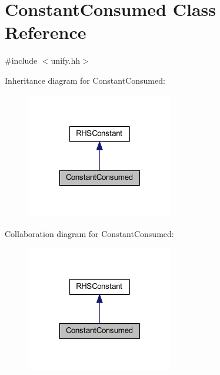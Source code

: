 \hypertarget{class_constant_consumed}{}\section{Constant\+Consumed Class Reference}
\label{class_constant_consumed}


{\ttfamily \#include $<$unify.\+hh$>$}



Inheritance diagram for Constant\+Consumed\+:
\nopagebreak
\begin{figure}[H]
\begin{center}
\leavevmode
\includegraphics[width=182pt]{class_constant_consumed__inherit__graph}
\end{center}
\end{figure}


Collaboration diagram for Constant\+Consumed\+:
\nopagebreak
\begin{figure}[H]
\begin{center}
\leavevmode
\includegraphics[width=182pt]{class_constant_consumed__coll__graph}
\end{center}
\end{figure}
